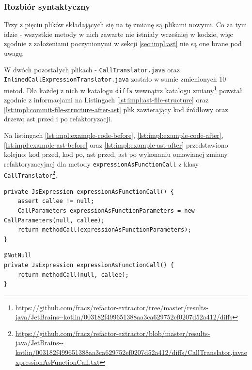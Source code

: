\documentclass[12pt]{report}
\begin{document}
\subsubsection{Rozbiór syntaktyczny}
Trzy z pięciu plików składających się na tę zmianę są plikami nowymi. Co za tym idzie - wszystkie metody w nich zawarte nie istniały wcześniej w kodzie, więc zgodnie z założeniami poczynionymi w sekcji \ref{sec:impl:ast} nie są one brane pod uwagę.

W dwóch pozostałych plikach - \texttt{CallTranslator.java} oraz \texttt{InlinedCallExpressionTranslator.java} zostało w sumie zmienionych 10 metod. Dla każdej z nich w katalogu \texttt{diffs} wewnątrz katalogu zmiany\footnote{\url{https://github.com/fracz/refactor-extractor/tree/master/results-java/JetBrains--kotlin/003182f499651388aa3ca629752ef0207d52a412/diffs}} powstał zgodnie z informacjami na Listingach \ref{lst:impl:ast-file-structure} oraz \ref{lst:impl:commit-file-structure-after-ast} plik zawierający kod źródłowy oraz drzewo \gls{ast} przed i po refaktoryzacji.

Na listingach \ref{lst:impl:example-code-before}, \ref{lst:impl:example-code-after}, \ref{lst:impl:example-ast-before} oraz \ref{lst:impl:example-ast-after} przedstawiono kolejno: kod przed, kod po, \gls{ast} przed, \gls{ast} po wykonaniu omawianej zmiany refaktoryzacyjnej dla metody \texttt{expressionAsFunctionCall} z klasy \texttt{CallTranslator}\footnote{\url{https://github.com/fracz/refactor-extractor/blob/master/results-java/JetBrains--kotlin/003182f499651388aa3ca629752ef0207d52a412/diffs/CallTranslator.javaexpressionAsFunctionCall.txt}}.

\begin{lstlisting}[frame=single,caption={Przykładowa metoda poddana refaktoryzacji: kod przed zmianą},captionpos=b,label={lst:impl:example-code-before}]
private JsExpression expressionAsFunctionCall() {
    assert callee != null;
    CallParameters expressionAsFunctionParameters = new CallParameters(null, callee);
    return methodCall(expressionAsFunctionParameters);
}
\end{lstlisting}

\begin{lstlisting}[frame=single,caption={Przykładowa metoda poddana refaktoryzacji: kod po zmianie},captionpos=b,label={lst:impl:example-code-after}]
@NotNull
private JsExpression expressionAsFunctionCall() {
    return methodCall(null, callee);
}
\end{lstlisting}
\end{document}
